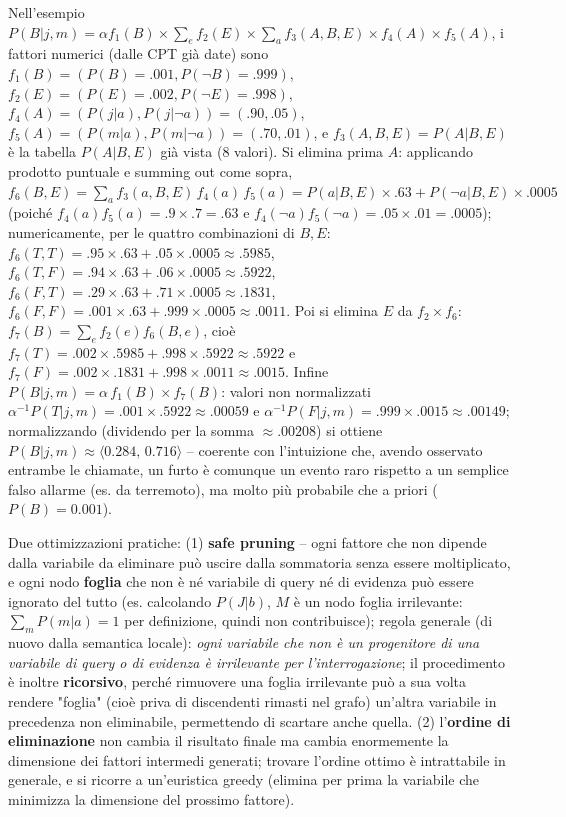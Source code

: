 \documentclass[a4paper,11pt]{article}
\begin{document}
Nell'esempio $P(B|j,m)=\alpha f_1(B)\times\sum_e f_2(E)\times\sum_a f_3(A,B,E)\times f_4(A)\times f_5(A)$, i fattori numerici (dalle CPT già date) sono $f_1(B)=(P(B){=}.001,P(\neg B){=}.999)$, $f_2(E)=(P(E){=}.002,P(\neg E){=}.998)$, $f_4(A)=(P(j|a),P(j|\neg a))=(.90,.05)$, $f_5(A)=(P(m|a),P(m|\neg a))=(.70,.01)$, e $f_3(A,B,E)=P(A|B,E)$ è la tabella $P(A|B,E)$ già vista (8 valori). Si elimina prima $A$: applicando prodotto puntuale e summing out come sopra, $f_6(B,E)=\sum_a f_3(a,B,E)\,f_4(a)\,f_5(a) = P(a|B,E)\times.63 + P(\neg a|B,E)\times.0005$ (poiché $f_4(a)f_5(a)=.9\times.7=.63$ e $f_4(\neg a)f_5(\neg a)=.05\times.01=.0005$); numericamente, per le quattro combinazioni di $B,E$: $f_6(T,T)=.95\times.63+.05\times.0005\approx.5985$, $f_6(T,F)=.94\times.63+.06\times.0005\approx.5922$, $f_6(F,T)=.29\times.63+.71\times.0005\approx.1831$, $f_6(F,F)=.001\times.63+.999\times.0005\approx.0011$. Poi si elimina $E$ da $f_2\times f_6$: $f_7(B)=\sum_e f_2(e)f_6(B,e)$, cioè $f_7(T)=.002\times.5985+.998\times.5922\approx.5922$ e $f_7(F)=.002\times.1831+.998\times.0011\approx.0015$. Infine $P(B|j,m)=\alpha\,f_1(B)\times f_7(B)$: valori non normalizzati $\alpha^{-1}P(T|j,m)=.001\times.5922\approx.00059$ e $\alpha^{-1}P(F|j,m)=.999\times.0015\approx.00149$; normalizzando (dividendo per la somma $\approx.00208$) si ottiene $P(B|j,m)\approx\langle0.284,\,0.716\rangle$ -- coerente con l'intuizione che, avendo osservato entrambe le chiamate, un furto è comunque un evento raro rispetto a un semplice falso allarme (es. da terremoto), ma molto più probabile che a priori ($P(B){=}0.001$).

Due ottimizzazioni pratiche: (1) \textbf{safe pruning} -- ogni fattore che non dipende dalla variabile da eliminare può uscire dalla sommatoria senza essere moltiplicato, e ogni nodo \textbf{foglia} che non è né variabile di query né di evidenza può essere ignorato del tutto (es. calcolando $P(J|b)$, $M$ è un nodo foglia irrilevante: $\sum_m P(m|a)=1$ per definizione, quindi non contribuisce); regola generale (di nuovo dalla semantica locale): \emph{ogni variabile che non è un progenitore di una variabile di query o di evidenza è irrilevante per l'interrogazione}; il procedimento è inoltre \textbf{ricorsivo}, perché rimuovere una foglia irrilevante può a sua volta rendere "foglia" (cioè priva di discendenti rimasti nel grafo) un'altra variabile in precedenza non eliminabile, permettendo di scartare anche quella. (2) l'\textbf{ordine di eliminazione} non cambia il risultato finale ma cambia enormemente la dimensione dei fattori intermedi generati; trovare l'ordine ottimo è intrattabile in generale, e si ricorre a un'euristica greedy (elimina per prima la variabile che minimizza la dimensione del prossimo fattore).
\end{document}
